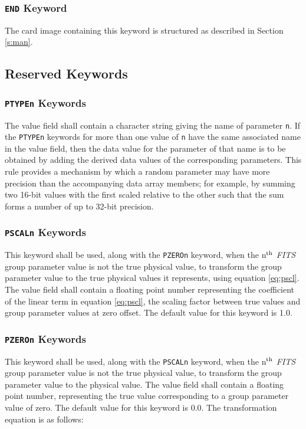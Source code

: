    \subsubsection{{\tt END} Keyword}
   The card image containing this keyword is structured as described 
   in Section \ref{s:man}.
  
  \subsection{Reserved Keywords}
  \label{s:rgrrk}   
   \subsubsection{{\tt PTYPEn} Keywords}
    \label{s:ptyp}
   The value field shall contain a character string 
   giving
   the name of parameter {\tt n}.  If the {\tt PTYPEn} 
   keywords for more than one value of {\tt n} have the same associated 
   name in the value field, then the data value for the parameter 
   of that name is to be obtained by adding the derived data values 
   of the corresponding parameters.  This rule provides a mechanism by 
   which a random parameter may have more precision than the
accompanying 
   data array members; for example, by summing two 16-bit values with the 
   first scaled relative to the other such that the sum forms a number of 
   up to 32-bit precision.
 
   \subsubsection{{\tt PSCALn} Keywords}
    \label{s:pscl}
   This keyword shall be used, along
   with the {\tt PZEROn}
   keyword, when the n$^{\rm th}$ {\em FITS\/} group parameter 
   value is not the true
   physical value, to transform the 
   group parameter value to the true physical values it represents, 
   using equation \ref{eq:pscl}. 
   The value field shall contain a floating point number representing 
   the coefficient of the linear term in equation \ref{eq:pscl}, the scaling 
   factor between true values and group parameter values 
   at zero offset.  The default value for this keyword is 1.0. 
  
   \subsubsection{{\tt PZEROn} Keywords}
   \label{s:pzer}
   This keyword shall be used, along
   with the {\tt PSCALn} keyword, when 
   the n$^{\rm th}$ {\em FITS\/} group parameter 
   value is not the true physical
   value, to transform the group parameter value to the physical value.  
   The value field shall contain a floating point number,
   representing the true value corresponding to a group
   parameter value of zero.  The default value for this keyword is 0.0.  
   The transformation equation is as follows:

